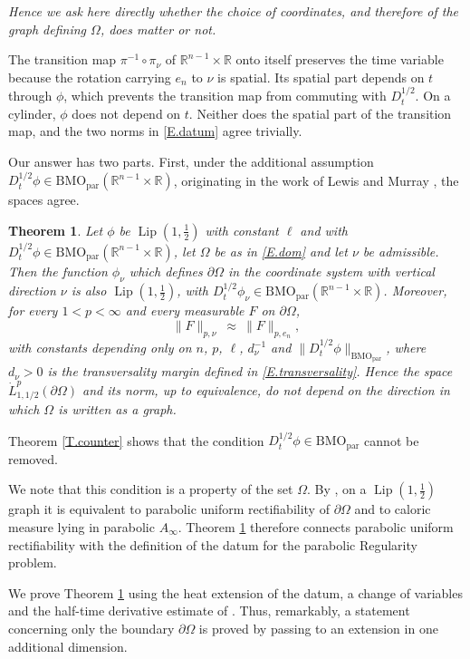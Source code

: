\documentclass[10pt,a4paper]{amsart}
\numberwithin{equation}{section}
\DeclareMathOperator{\Lip}{Lip}
\newcommand{\R}{\mathbb R}
\newcommand{\om}{\Omega}
\newcommand{\pom}{\partial\Omega}
\newcommand{\dhalf}{D_t^{1/2}}
\newcommand{\BMOpar}{\mathrm{BMO}_{\mathrm{par}}}
\newtheorem{theorem}[equation]{Theorem}
\begin{document}
\emph{Hence we ask here directly whether the choice of coordinates, and therefore
of the graph defining $\om$, does matter or not.}\medskip

\noindent The transition map $\pi^{-1}\circ\pi_\nu$ of
$\R^{n-1}\times\R$ onto itself preserves the time variable because the
rotation carrying $e_n$ to $\nu$ is spatial. Its spatial part depends on $t$
through $\phi$, which prevents the transition map from commuting with
$\dhalf$. On a cylinder, $\phi$ does not depend on $t$. Neither does the
spatial part of the transition map, and the two norms in \eqref{E.datum} agree
trivially.\medskip

Our answer has two parts. First, under the additional assumption
$\dhalf\phi\in\BMOpar(\R^{n-1}\times\R)$, originating in the work of Lewis
and Murray \cite{LM}, the spaces agree.

\begin{theorem}\label{T.main}
Let $\phi$ be $\Lip(1,\tfrac12)$ with constant $\ell$ and with
$\dhalf\phi\in\BMOpar(\R^{n-1}\times\R)$, let $\om$ be as in \eqref{E.dom} and
let $\nu$ be admissible. Then the function $\phi_\nu$ which defines $\pom$ in
the coordinate system with vertical direction $\nu$ is also
$\Lip(1,\tfrac12)$, with
$\dhalf\phi_\nu\in\BMOpar(\R^{n-1}\times\R)$. Moreover, for every
$1<p<\infty$ and every measurable $F$ on $\pom$,
\begin{equation}\label{E.main}
  \|F\|_{p,\nu}\ \approx\ \|F\|_{p,e_n} ,
\end{equation}
with constants depending only on $n$, $p$, $\ell$, $d_\nu^{-1}$ and
$\|\dhalf\phi\|_{\BMOpar}$, where $d_\nu>0$ is the transversality margin
defined in \eqref{E.transversality}. Hence the space $\dot L^p_{1,1/2}(\pom)$ and its
norm, up to equivalence, do not depend on the direction in which $\om$ is
written as a graph.
\end{theorem}

Theorem \ref{T.counter} shows that the condition
$\dhalf\phi\in\BMOpar$ cannot be removed.\medskip

\noindent We note that this condition is a property of the set $\om$.
By \cite[Theorem 1.2]{BHMN}, on a $\Lip(1,\tfrac12)$ graph it is equivalent
to parabolic uniform rectifiability of $\pom$ and to caloric measure lying in
parabolic $A_\infty$. Theorem \ref{T.main} therefore connects parabolic
uniform rectifiability with the definition of the datum for the parabolic
Regularity problem.\medskip

We prove Theorem \ref{T.main} using the heat extension of the datum, a change
of variables and the half-time derivative estimate of
\cite[Theorem 1.7]{DLPN}. Thus, remarkably, a statement concerning only the
boundary $\pom$ is proved by passing to an extension in one additional
dimension.\medskip
\end{document}
